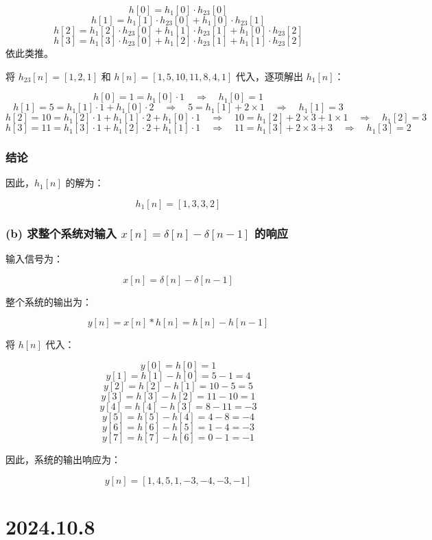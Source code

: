\documentclass[UTF8]{report}
\theoremstyle{MyLineTheoremStyle} %
\theoremstyle{MyBlockTheoremStyle} %
\theoremstyle{MySubsubsectionStyle} %
\begin{document}
\[
h[0] = h_1[0] \cdot h_{23}[0]
\]
\[
h[1] = h_1[1] \cdot h_{23}[0] + h_1[0] \cdot h_{23}[1]
\]
\[
h[2] = h_1[2] \cdot h_{23}[0] + h_1[1] \cdot h_{23}[1] + h_1[0] \cdot h_{23}[2]
\]
\[
h[3] = h_1[3] \cdot h_{23}[0] + h_1[2] \cdot h_{23}[1] + h_1[1] \cdot h_{23}[2]
\]
依此类推。

将 $h_{23}[n] = [1, 2, 1]$ 和 $h[n] = [1, 5, 10, 11, 8, 4, 1]$ 代入，逐项解出 $h_1[n]$：

\[
h[0] = 1 = h_1[0] \cdot 1 \quad \Rightarrow \quad h_1[0] = 1
\]
\[
h[1] = 5 = h_1[1] \cdot 1 + h_1[0] \cdot 2 \quad \Rightarrow \quad 5 = h_1[1] + 2 \times 1 \quad \Rightarrow \quad h_1[1] = 3
\]
\[
h[2] = 10 = h_1[2] \cdot 1 + h_1[1] \cdot 2 + h_1[0] \cdot 1 \quad \Rightarrow \quad 10 = h_1[2] + 2 \times 3 + 1 \times 1 \quad \Rightarrow \quad h_1[2] = 3
\]
\[
h[3] = 11 = h_1[3] \cdot 1 + h_1[2] \cdot 2 + h_1[1] \cdot 1 \quad \Rightarrow \quad 11 = h_1[3] + 2 \times 3 + 3 \quad \Rightarrow \quad h_1[3] = 2
\]

\subsection*{结论}

因此，$h_1[n]$ 的解为：

\[
h_1[n] = [1, 3, 3, 2]
\]


\subsection*{(b) 求整个系统对输入 $x[n] = \delta[n] - \delta[n-1]$ 的响应}

输入信号为：

\[
x[n] = \delta[n] - \delta[n-1]
\]

整个系统的输出为：

\[
y[n] = x[n] * h[n] = h[n] - h[n-1]
\]

将 $h[n]$ 代入：

\[
y[0] = h[0] = 1
\]
\[
y[1] = h[1] - h[0] = 5 - 1 = 4
\]
\[
y[2] = h[2] - h[1] = 10 - 5 = 5
\]
\[
y[3] = h[3] - h[2] = 11 - 10 = 1
\]
\[
y[4] = h[4] - h[3] = 8 - 11 = -3
\]
\[
y[5] = h[5] - h[4] = 4 - 8 = -4
\]
\[
y[6] = h[6] - h[5] = 1 - 4 = -3
\]
\[
y[7] = h[7] - h[6] = 0 - 1 = -1
\]

因此，系统的输出响应为：

\[
y[n] = [1, 4, 5, 1, -3, -4, -3, -1]
\]


\chapter{2024.10.8}\thispagestyle{fancy}
\end{document}

